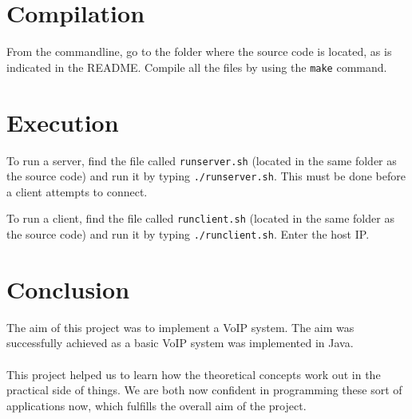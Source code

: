 \documentclass[13pt]{article}
\begin{document}
\section{Compilation}

From the commandline, go to the folder where the source code is located, as is
indicated in the README. Compile all the files by using the \texttt{make} command.

\section{Execution}

To run a server, find the file called \texttt{run\textunderscore server.sh} (located in the same folder as the source code) and run it by typing \texttt{.\slash run\textunderscore server.sh}. This must be done before a client attempts to connect.

To run a client, find the file called \texttt{run\textunderscore client.sh} (located in the same folder as the source code) and run it by typing \texttt{.\slash run\textunderscore client.sh}. Enter the host IP.

\section{Conclusion}

The aim of this project was to implement a VoIP system. The aim was successfully achieved as a basic VoIP system was implemented in Java.
\\\\
This project helped us to learn how the theoretical concepts work out in the practical side of things. We are both now confident in programming these sort of applications now, which fulfills the overall aim of the project.
\end{document}
